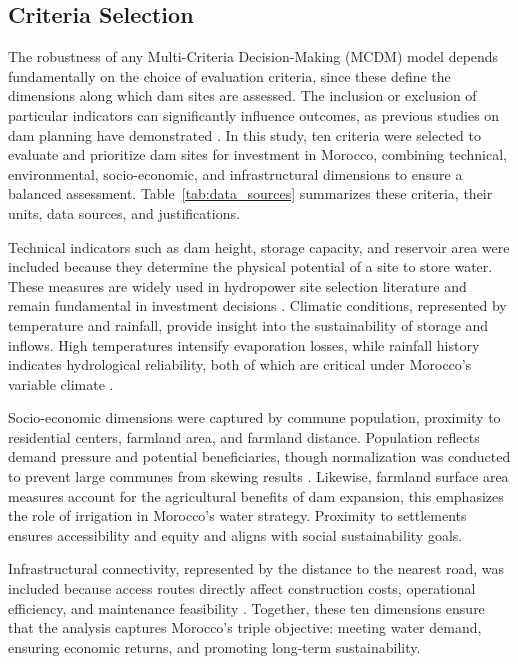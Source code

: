 \subsection{Criteria Selection}
The robustness of any Multi-Criteria Decision-Making (MCDM) model depends fundamentally on the choice of evaluation criteria, since these define the dimensions along which dam sites are assessed. The inclusion or exclusion of particular indicators can significantly influence outcomes, as previous studies on dam planning have demonstrated \cite{Roudgarmi2019}. In this study, ten criteria were selected to evaluate and prioritize dam sites for investment in Morocco, combining technical, environmental, socio-economic, and infrastructural dimensions to ensure a balanced assessment. Table~\ref{tab:data_sources} summarizes these criteria, their units, data sources, and justifications.

Technical indicators such as dam height, storage capacity, and reservoir area were included because they determine the physical potential of a site to store water. These measures are widely used in hydropower site selection literature and remain fundamental in investment decisions \cite{MOIZ2018309,Rana2020}. Climatic conditions, represented by temperature and rainfall, provide  insight into the sustainability of storage and inflows. High temperatures intensify evaporation losses, while rainfall history indicates hydrological reliability, both of which are critical under Morocco's variable climate \cite{Belokda2018}.

Socio-economic dimensions were captured by commune population, proximity to residential centers, farmland area, and farmland distance. Population reflects demand pressure and potential beneficiaries, though normalization was conducted to prevent large communes from skewing results \cite{Ersoy2022,Kosareva2018}. Likewise, farmland surface area measures account for the agricultural benefits of dam expansion, this emphasizes the role of irrigation in Morocco's water strategy. Proximity to settlements ensures accessibility and equity and aligns with social sustainability goals.

Infrastructural connectivity, represented by the distance to the nearest road, was included because access routes directly affect construction costs, operational efficiency, and maintenance feasibility \cite{YI2010852}. Together, these ten dimensions ensure that the analysis captures Morocco's triple objective: meeting water demand, ensuring economic returns, and promoting long-term sustainability.

